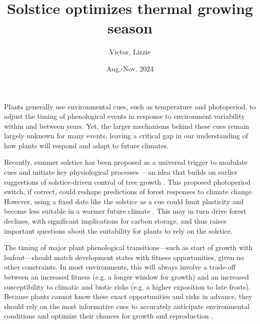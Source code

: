 \documentclass[11pt,letter]{article}
\title{Solstice optimizes thermal growing season}
\author{Victor, Lizzie}
\date{Aug.-Nov. 2024}
\begin{document}
\maketitle


Plants generally use environmental cues, such as temperature and photoperiod, to adjust the timing of phenological events in response to environment variability within and between years. Yet, the larger mechanisms behind these cues remain largely unknown for many events, leaving a critical gap in our understanding of how plants will respond and adapt to future climates.

Recently, summer solstice has been proposed as a universal trigger to modulate cues and initiate key physiological processes \citep{Zohner2023, Journe2024}---an idea that builds on earlier suggestions of solstice-driven control of tree growth \citep{Rossi2006}. This proposed photoperiod switch, if correct, could reshape predictions of forest responses to climate change. 
However, using a fixed date like the solstice as a cue could limit plasticity and become less suitable in a warmer future climate \citep{Wolkovich2021}. 
This may in turn drive forest declines, with significant implications for carbon storage, and thus raises important questions about the suitability for plants to rely on the solstice. 

The timing of major plant phenological transitions---such as start of growth with leafout---should match development states with fitness opportunities, given no other constraints. In most environments, this will always involve a trade-off between an increased fitness (e.g. a longer window for growth) and an increased susceptibility to climatic and biotic risks (e.g. a higher exposition to late frosts). Because plants cannot know these exact opportunities and risks in advance, they should rely on the most informative cues to accurately anticipate environmental conditions and optimize their chances for growth and reproduction \citep{Chevin2015, Bonamour2019}.
\end{document}
